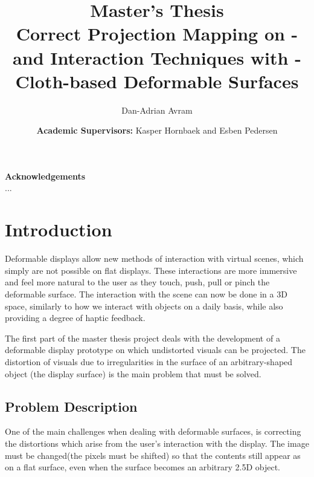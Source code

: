 \documentclass[]{article}
\title{\textbf{Master's Thesis} \\ Correct Projection Mapping on - and Interaction Techniques with - Cloth-based Deformable Surfaces}
\author{Dan-Adrian Avram}
\author{\textbf{Academic Supervisors:} Kasper Hornbaek and Esben Pedersen}
\begin{document}
\maketitle
\thispagestyle{empty}
\newpage
\begin{center}
{\LARGE \textbf{Acknowledgements}}\\
\bigskip
\bigskip
...
\end{center}

\maketitle
\thispagestyle{empty}
\newpage
\thispagestyle{empty}
\begin{abstract}

\end{abstract}

\newpage

\renewcommand{\thepage}{\roman{page}}%
\setcounter{page}{1}
\tableofcontents

\newpage
\listoffigures
\newpage
\listoftables 
\newpage
\renewcommand{\thepage}{\arabic{page}}%
\setcounter{page}{1}
\section{Introduction}



Deformable displays allow new methods of interaction with virtual scenes, which simply are not possible on flat displays. These interactions are more immersive and feel more natural to the user as they touch, push, pull or pinch the deformable surface. The interaction with the scene can now be done in a 3D space, similarly to how we interact with objects on a daily basis, while also providing a degree of haptic feedback.

The first part of the master thesis project deals with the development of a deformable display prototype on which undistorted visuals can be projected. The distortion of visuals due to irregularities in the surface of an arbitrary-shaped object (the display surface) is the main problem that must be solved. 

\subsection{Problem Description}

One of the main challenges when dealing with deformable surfaces, is correcting the distortions which arise from the user's interaction with the display. The image must be changed(the pixels must be shifted) so that the contents still appear as on a flat surface, even when the surface becomes an arbitrary 2.5D object.
\end{document}
